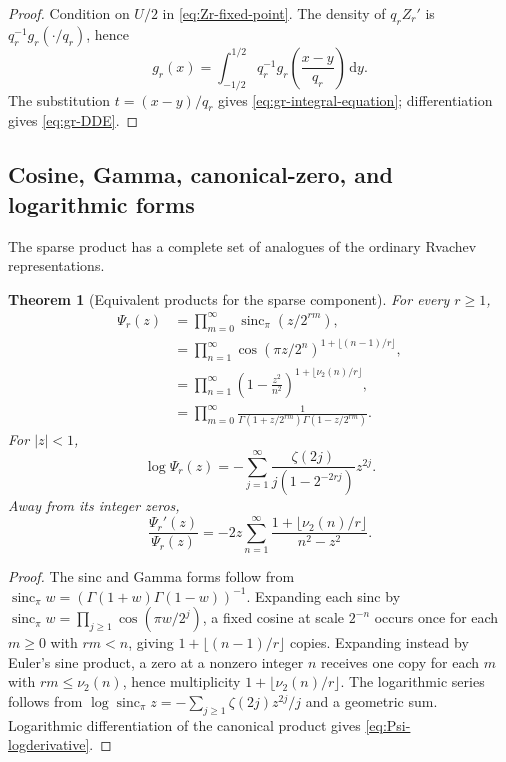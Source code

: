 \documentclass[11pt,oneside]{article}
\numberwithin{equation}{section}
\newtheorem{theorem}{Theorem}[section]
\theoremstyle{definition}
\theoremstyle{remark}
\newcommand{\sincpi}{\operatorname{sinc}_{\pi}}
\newcommand{\vtwo}{\nu_2}
\newcommand{\dd}{\,\mathrm d}
\begin{document}
\begin{proof}
Condition on $U/2$ in \eqref{eq:Zr-fixed-point}.  The density of $q_rZ_r'$ is
$q_r^{-1}g_r(\cdot/q_r)$, hence
\[
 g_r(x)=\int_{-1/2}^{1/2}q_r^{-1}
 g_r\!\left(\frac{x-y}{q_r}\right)\dd y.
\]
The substitution $t=(x-y)/q_r$ gives
\eqref{eq:gr-integral-equation}; differentiation gives
\eqref{eq:gr-DDE}.
\end{proof}

\subsection{Cosine, Gamma, canonical-zero, and logarithmic forms}

The sparse product has a complete set of analogues of the ordinary Rvachev
representations.

\begin{theorem}[Equivalent products for the sparse component]
\label{thm:Psi-products}
For every $r\ge1$,
\begin{align}
 \Psi_r(z)
 &=\prod_{m=0}^{\infty}\sincpi(z/2^{rm}),                  \label{eq:Psi-sinc}\\
 &=\prod_{n=1}^{\infty}
   \cos(\pi z/2^n)^{1+\lfloor(n-1)/r\rfloor},              \label{eq:Psi-cos}\\
 &=\prod_{n=1}^{\infty}
   \left(1-\frac{z^2}{n^2}\right)^{1+\lfloor\vtwo(n)/r\rfloor}, \label{eq:Psi-canonical}\\
 &=\prod_{m=0}^{\infty}
   \frac1{\Gamma(1+z/2^{rm})\Gamma(1-z/2^{rm})}.           \label{eq:Psi-gamma}
\end{align}
For $|z|<1$,
\begin{equation}
 \log\Psi_r(z)
 =-\sum_{j=1}^{\infty}
   \frac{\zeta(2j)}{j(1-2^{-2rj})}z^{2j}.                 \label{eq:Psi-log-zeta}
\end{equation}
Away from its integer zeros,
\begin{equation}
 \frac{\Psi_r'(z)}{\Psi_r(z)}
 =-2z\sum_{n=1}^{\infty}
   \frac{1+\lfloor\vtwo(n)/r\rfloor}{n^2-z^2}.            \label{eq:Psi-logderivative}
\end{equation}
\end{theorem}

\begin{proof}
The sinc and Gamma forms follow from
$\sincpi w=(\Gamma(1+w)\Gamma(1-w))^{-1}$.  Expanding each sinc by
$\sincpi w=\prod_{j\ge1}\cos(\pi w/2^j)$, a fixed cosine at scale $2^{-n}$
occurs once for each $m\ge0$ with $rm<n$, giving
$1+\lfloor(n-1)/r\rfloor$ copies.  Expanding instead by Euler's sine product,
a zero at a nonzero integer $n$ receives one copy for each $m$ with
$rm\le\vtwo(n)$, hence multiplicity $1+\lfloor\vtwo(n)/r\rfloor$.
The logarithmic series follows from
\(
 \log\sincpi z=-\sum_{j\ge1}\zeta(2j)z^{2j}/j
\)
and a geometric sum.  Logarithmic differentiation of the canonical product
gives \eqref{eq:Psi-logderivative}.
\end{proof}
\end{document}
